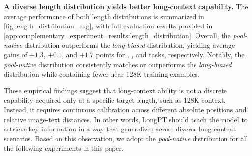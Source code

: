\noindent\textbf{A diverse length distribution yields better long-context capability.}
The average performance of both length distributions is summarized in \cref{fig:length_distribution_avg}, with full evaluation results provided in \cref{app:complementary_experiment_results:length_distribution}.
Overall, the \emph{pool-native} distribution outperforms the \emph{long-biased} distribution, yielding average gains of $+1.3$, $+0.1$, and $+1.7$ points for \extractsingle, \extractmulti, and \reasoningtask tasks, respectively.
Notably, the \emph{pool-native} distribution consistently matches or outperforms the \emph{long-biased} distribution while containing fewer near-128K training examples.

These empirical findings suggest that long-context ability is not a discrete capability acquired only at a specific target length, such as 128K context.
Instead, it requires continuous calibration across different absolute positions and relative image-text distances.
In other words, LongPT should teach the model to retrieve key information in a way that generalizes across diverse long-context scenarios.
Based on this observation, we adopt the \emph{pool-native} distribution for all the following experiments in this paper.

\begin{table}[t]
 \centering
 \caption{\textbf{Short-context performance under different short-data mixing ratios.}
 We report the average over six short-context benchmarks together with per-benchmark scores. \textbf{Short Data} means the proportion of short-context data. $0\%$ means only using long-context data.}
 \label{tab:short_mix_short_performance}
 \setlength{\tabcolsep}{4pt}
\end{table}

